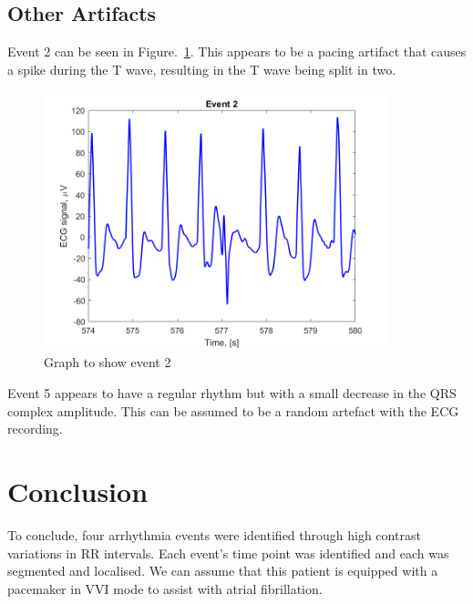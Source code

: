 \documentclass[conference]{IEEEtran}
\begin{document}
\subsection{Other Artifacts}
Event 2 can be seen in Figure.~\ref{fig:E2}. This appears to be a pacing artifact that causes a spike during the T wave, resulting in the T wave being split in two.

\begin{figure}[ht]
\centering
\includegraphics[width=10cm]{images/E2.png}
\caption{Graph to show event 2}
\label{fig:E2}
\end{figure}

Event 5 appears to have a regular rhythm but with a small decrease in the QRS complex amplitude. This can be assumed to be a random artefact with the ECG recording.




\section{Conclusion}

To conclude, four arrhythmia events were identified through high contrast variations in RR intervals. Each event's time point was identified and each was segmented and localised. We can assume that this patient is equipped with a pacemaker in VVI mode to assist with atrial fibrillation.

%  
\end{document}
